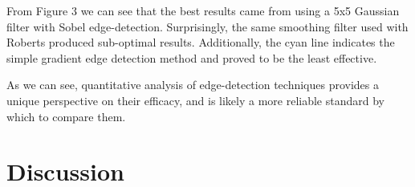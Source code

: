 \documentclass[a4paper]{article}
\newenvironment{floatfig}
  {\par\medskip\noindent\minipage{\linewidth}}
  {\endminipage\par\medskip}
\begin{document}
\begin{multicols*}{2}
\begin{floatfig}
{
    }{\columnwidth}

    \vspace{-1em}
    \centering
    \vspace{0.6em}
\end{floatfig}

From Figure 3 we can see that the best results came from using a 5x5 Gaussian filter with Sobel edge-detection. Surprisingly, the same smoothing filter used with Roberts produced sub-optimal results. Additionally, the cyan line indicates the simple gradient edge detection method and proved to be the least effective.

As we can see, quantitative analysis of edge-detection techniques provides a unique perspective on their efficacy, and is likely a more reliable standard by which to compare them.


\section*{Discussion}


\end{multicols*}
\end{document}
